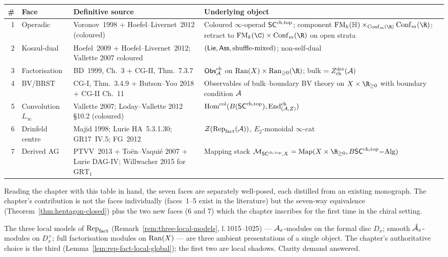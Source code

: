 \begin{center}
\begin{tabular}{rllp{}}
\toprule
\# & Face & Definitive source & Underlying object \\
\midrule
1 & Operadic & Voronov~1998 + Hoefel--Livernet~2012 (coloured) & Coloured $\infty$-operad $\mathsf{SC}^{\mathrm{ch},\mathrm{top}}$; component $\FM_k(\mathbb H) \times_{\Conf_m(\R)} \Conf_m(\R)$; retract to $\FM_k(\C) \times \Conf_m(\R)$ on open strata \\
2 & Koszul-dual & Hoefel~2009 + Hoefel--Livernet~2012; Vallette 2007 coloured & $(\mathsf{Lie}, \mathsf{Ass}, \text{shuffle-mixed})$; non-self-dual \\
3 & Factorisation & BD~1999, Ch.~3 + CG-II, Thm.~7.3.7 & $\mathsf{Obs}^{\mathrm{ch}}_{\mathcal{A}}$ on $\Ran(X) \times \Ran_{\ge 0}(\R)$; bulk $= Z^{\mathrm{der}}_{\mathrm{ch}}(\mathcal{A})$ \\
4 & BV/BRST & CG-I, Thm.~3.4.9 + Butson--Yoo 2018 + CG-II Ch.~11 & Observables of bulk--boundary BV theory on $X \times \R_{\ge 0}$ with boundary condition $\mathcal{A}$ \\
5 & Convolution $L_\infty$ & Vallette 2007; Loday--Vallette 2012 \S10.2 (coloured) & $\mathrm{Hom}^{\mathrm{col}}(B(\mathsf{SC}^{\mathrm{ch},\mathrm{top}}), \mathrm{End}^{\mathrm{ch}}_{(\mathcal{A}, Z)})$ \\
6 & Drinfeld centre & Majid 1998; Lurie HA~5.3.1.30; GR17~IV.5; FG~2012 & $\mathcal{Z}(\mathrm{Rep}_{\mathrm{fact}}(\mathcal{A}))$, $E_2$-monoidal $\infty$-cat \\
7 & Derived AG & PTVV~2013 + To\"en--Vaqui\'e 2007 + Lurie DAG-IV; Willwacher 2015 for $\mathrm{GRT}_1$ & Mapping stack $\cM_{\SCchtop, X} = \mathrm{Map}(X \times \R_{\ge 0}, B\SCchtop\mathrm{-Alg})$ \\
\bottomrule
\end{tabular}
\end{center}

Reading the chapter with this table in hand, the seven faces are separately well-posed, each distilled from an existing monograph. The chapter's contribution is not the faces individually (faces~1--5 exist in the literature) but the seven-way equivalence (Theorem~\ref*{thm:heptagon-closed}) plus the two new faces (6 and 7) which the chapter inscribes for the first time in the chiral setting.

The three local models of $\mathrm{Rep}_{\mathrm{fact}}$ (Remark~\ref*{rem:three-local-models}, l.\,1015--1025) --- $\mathcal{A}_x$-modules on the formal disc $D_x$; smooth $\hat{\mathcal{A}}_x$-modules on $D^\times_x$; full factorisation modules on $\mathrm{Ran}(X)$ --- are three ambient presentations of a single object. The chapter's authoritative choice is the third (Lemma~\ref*{lem:rep-fact-local-global}); the first two are local shadows. Clarity demand answered.

